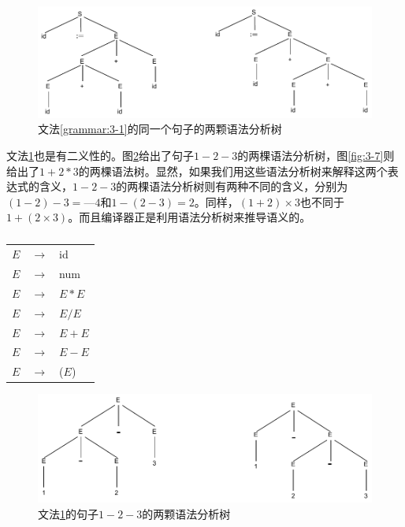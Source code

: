 \documentclass[cn,11pt,chinese]{elegantbook}
\begin{document}
\begin{figure}[htbp]
  \centering
  \includegraphics[width=.8\textwidth]{3-4.pdf}
  \caption{文法\ref{grammar:3-1}的同一个句子的两颗语法分析树}
  \label{fig:3-4}  
\end{figure}

文法\ref{grammar:3-2}也是有二义性的。图\ref{fig:3-6}给出了句子$1-2-3$的两棵语法分析树，图\ref{fig:3-7}则给出了$1+2*3$的两棵语法树。显然，如果我们用这些语法分析树来解释这两个表达式的含义，$1-2-3$的两棵语法分析树则有两种不同的含义，分别为$(1-2)-3=—4$和$1-(2-3)=2$。同样，$(1+2)\times 3$也不同于$1+(2\times 3)$。而且编译器正是利用语法分析树来推导语义的。

\renewcommand\tablename{文法}
\begin{table}[htbp]
  \centering
  \begin{tabular}{lll}
    \toprule
    $E$ & $\rightarrow$ & id \\
    $E$ & $\rightarrow$ & num \\
    $E$ & $\rightarrow$ & $E*E$ \\
    $E$ & $\rightarrow$ & $E/E$ \\
    $E$ & $\rightarrow$ & $E+E$ \\
    $E$ & $\rightarrow$ & $E-E$ \\
    $E$ & $\rightarrow$ & ($E$) \\
    \bottomrule
  \end{tabular}
  \caption{}
  \label{grammar:3-2}
\end{table}
\renewcommand\tablename{表}

\begin{figure}[htbp]
  \centering
  \includegraphics[width=.8\textwidth]{3-6.pdf}
  \caption{文法\ref{grammar:3-2}的句子$1-2-3$的两颗语法分析树}
  \label{fig:3-6}
\end{figure}
\end{document}

